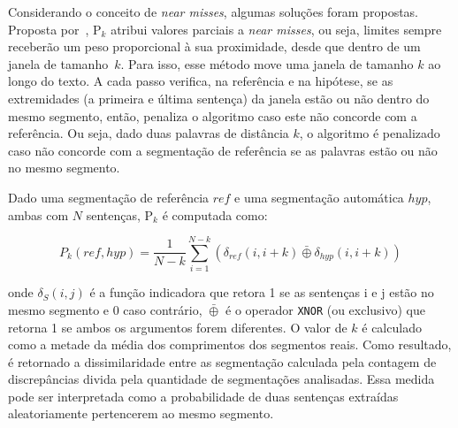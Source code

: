 \documentclass[10pt,a4paper]{article}
\begin{document}

Considerando o conceito de \textit{near misses}, algumas soluções foram propostas. Proposta por~\cite{Beeferman1999}, P$_k$ atribui valores parciais a \textit{near misses}, ou seja, limites sempre receberão um peso proporcional à sua proximidade, desde que dentro de um janela de tamanho~$k$.  Para isso, esse método move uma janela de tamanho $k$ ao longo do texto. A cada passo verifica, na referência e na hipótese, se as extremidades (a primeira e última sentença) da janela estão ou não dentro do mesmo segmento, então, penaliza o algoritmo caso este não concorde com a referência. Ou seja, dado duas palavras de distância $k$, o algoritmo é penalizado caso não concorde com a segmentação de referência se as palavras estão ou não no mesmo segmento. 

Dado uma segmentação de referência $ref$ e uma segmentação automática $hyp$, ambas com $N$ sentenças, P$_k$ é computada como: 


\begin{equation}
P_k(ref,hyp) = \frac{1}{N - k}
\sum_{i=1}^{N-k } 
(
\delta_{ref}(i, i+k) 
\bar{\oplus}
\delta_{hyp}(i, i+k) 
)
\end{equation}


onde $\delta_S(i,j)$ é a função indicadora que retora 1 se as sentenças i e j estão no mesmo segmento e 0 caso contrário, $\bar{\oplus}$ é o operador \texttt{XNOR} (ou exclusivo) que retorna 1 se ambos os argumentos forem diferentes. 
%
%
O valor de $k$ é calculado como a metade da média dos comprimentos dos segmentos reais. Como resultado, é retornado a
dissimilaridade entre as segmentação calculada pela contagem de discrepâncias divida pela quantidade de segmentações analisadas. Essa medida pode ser interpretada como a probabilidade de duas sentenças extraídas aleatoriamente pertencerem ao mesmo segmento.  


\end{document}
